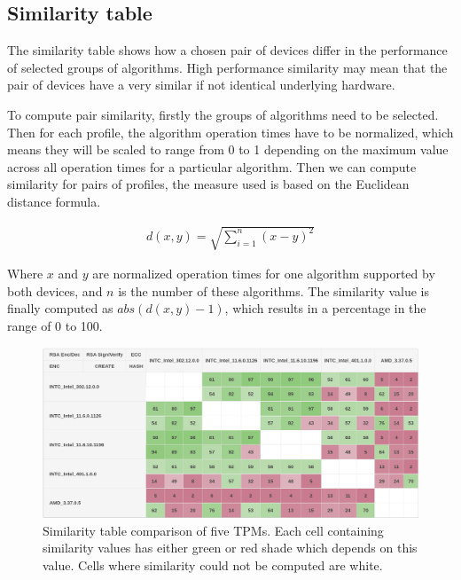 \subsection{Similarity table}
The similarity table shows how a chosen pair of devices differ in the performance of selected groups of algorithms. High performance similarity may mean that the pair of devices have a very similar if not identical underlying hardware.

To compute pair similarity, firstly the groups of algorithms need to be selected. Then for each profile, the algorithm operation times have to be normalized, which means they will be scaled to range from 0 to 1 depending on the maximum value across all operation times for a particular algorithm. Then we can compute similarity for pairs of profiles, the measure used is based on the Euclidean distance formula.


\begin{align*}
    d(x, y) = \sqrt{\sum_{i=1}^{n}(x - y)^{2}} 
\end{align*}

Where $x$ and $y$ are normalized operation times for one algorithm supported by both devices, and $n$ is the number of these algorithms. The similarity value is finally computed as $abs(d(x, y) - 1)$, which results in a percentage in the range of 0 to 100.

\begin{figure}[!tbp]
    \centering
    \includegraphics[width=\textwidth]{img/visualizations/tpm-similarity-intext.png}
    \caption{Similarity table comparison of five TPMs. Each cell containing similarity values has either green or red shade which depends on this value. Cells where similarity could not be computed are white.}
    \label{fig:my_label}
\end{figure}




